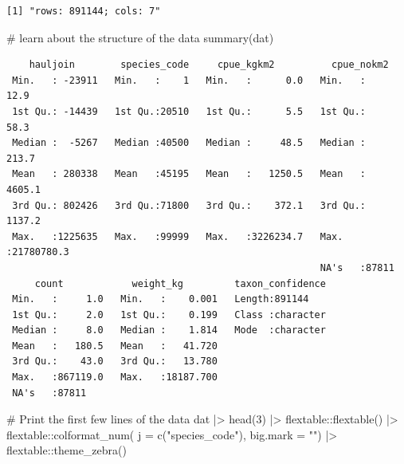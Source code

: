 \documentclass[
  letterpaper,
  oneside,
  open=any]{scrbook}
\newenvironment{Shaded}{\begin{snugshade}}{\end{snugshade}}
\newcommand{\AttributeTok}[1]{\textcolor[rgb]{0.40,0.45,0.13}{#1}}
\newcommand{\CommentTok}[1]{\textcolor[rgb]{0.37,0.37,0.37}{#1}}
\newcommand{\DecValTok}[1]{\textcolor[rgb]{0.68,0.00,0.00}{#1}}
\newcommand{\FunctionTok}[1]{\textcolor[rgb]{0.28,0.35,0.67}{#1}}
\newcommand{\NormalTok}[1]{\textcolor[rgb]{0.00,0.23,0.31}{#1}}
\newcommand{\SpecialCharTok}[1]{\textcolor[rgb]{0.37,0.37,0.37}{#1}}
\newcommand{\StringTok}[1]{\textcolor[rgb]{0.13,0.47,0.30}{#1}}
\begin{document}
\begin{verbatim}
[1] "rows: 891144; cols: 7"
\end{verbatim}

\begin{Shaded}
\begin{Highlighting}[]
\CommentTok{\# learn about the structure of the data}
\FunctionTok{summary}\NormalTok{(dat)}
\end{Highlighting}
\end{Shaded}

\begin{verbatim}
    hauljoin        species_code     cpue_kgkm2          cpue_nokm2        
 Min.   : -23911   Min.   :    1   Min.   :      0.0   Min.   :      12.9  
 1st Qu.: -14439   1st Qu.:20510   1st Qu.:      5.5   1st Qu.:      58.3  
 Median :  -5267   Median :40500   Median :     48.5   Median :     213.7  
 Mean   : 280338   Mean   :45195   Mean   :   1250.5   Mean   :    4605.1  
 3rd Qu.: 802426   3rd Qu.:71800   3rd Qu.:    372.1   3rd Qu.:    1137.2  
 Max.   :1225635   Max.   :99999   Max.   :3226234.7   Max.   :21780780.3  
                                                       NA's   :87811       
     count            weight_kg         taxon_confidence  
 Min.   :     1.0   Min.   :    0.001   Length:891144     
 1st Qu.:     2.0   1st Qu.:    0.199   Class :character  
 Median :     8.0   Median :    1.814   Mode  :character  
 Mean   :   180.5   Mean   :   41.720                     
 3rd Qu.:    43.0   3rd Qu.:   13.780                     
 Max.   :867119.0   Max.   :18187.700                     
 NA's   :87811                                            
\end{verbatim}

\begin{Shaded}
\begin{Highlighting}[]
\CommentTok{\# Print the first few lines of the data }
\NormalTok{dat }\SpecialCharTok{|\textgreater{}} 
  \FunctionTok{head}\NormalTok{(}\DecValTok{3}\NormalTok{) }\SpecialCharTok{|\textgreater{}} 
\NormalTok{  flextable}\SpecialCharTok{::}\FunctionTok{flextable}\NormalTok{() }\SpecialCharTok{|\textgreater{}}
\NormalTok{  flextable}\SpecialCharTok{::}\FunctionTok{colformat\_num}\NormalTok{(}
      \AttributeTok{j =} \FunctionTok{c}\NormalTok{(}\StringTok{"species\_code"}\NormalTok{), }
      \AttributeTok{big.mark =} \StringTok{""}\NormalTok{) }\SpecialCharTok{|\textgreater{}} 
\NormalTok{  flextable}\SpecialCharTok{::}\FunctionTok{theme\_zebra}\NormalTok{()}
\end{Highlighting}
\end{Shaded}
\end{document}
